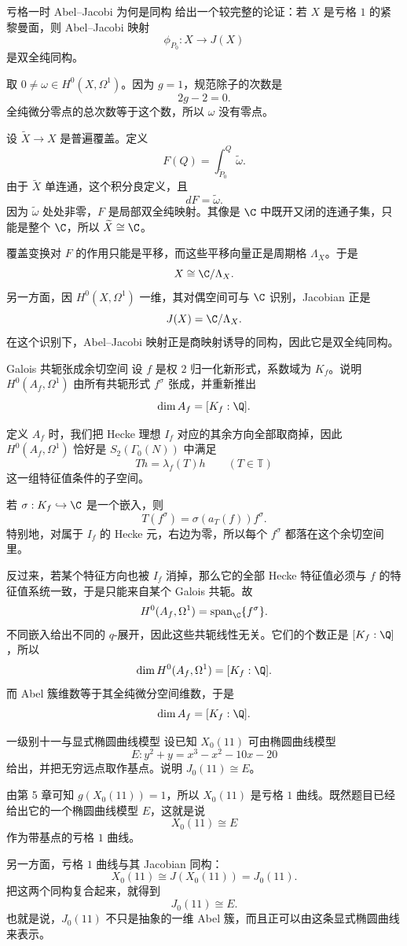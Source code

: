 \begin{problem}{亏格一时 Abel--Jacobi 为何是同构}
\hard
给出一个较完整的论证：若 $X$ 是亏格 $1$ 的紧黎曼面，则 Abel--Jacobi 映射
\[
\phi_{P_0}:X\to J(X)
\]
是双全纯同构。
\end{problem}
\begin{solution}
取 $0\ne \omega\in H^0(X,\Omega^1)$。因为 $g=1$，规范除子的次数是
\[
2g-2=0.
\]
全纯微分零点的总次数等于这个数，所以 $\omega$ 没有零点。

设 $\widetilde X\to X$ 是普遍覆盖。定义
\[
F(Q)=\int_{\widetilde P_0}^{Q}\widetilde\omega.
\]
由于 $\widetilde X$ 单连通，这个积分良定义，且
\[
dF=\widetilde\omega.
\]
因为 $\widetilde\omega$ 处处非零，$F$ 是局部双全纯映射。其像是 $\C$ 中既开又闭的连通子集，只能是整个 $\C$，所以 $\widetilde X\cong \C$。

覆盖变换对 $F$ 的作用只能是平移，而这些平移向量正是周期格 $\Lambda_X$。于是
\[
X\cong \C/\Lambda_X.
\]
另一方面，因 $H^0(X,\Omega^1)$ 一维，其对偶空间可与 $\C$ 识别，Jacobian 正是
\[
J(X)=\C/\Lambda_X.
\]
在这个识别下，Abel--Jacobi 映射正是商映射诱导的同构，因此它是双全纯同构。
\end{solution}

\begin{problem}{Galois 共轭张成余切空间}
\hard
设 $f$ 是权 $2$ 归一化新形式，系数域为 $K_f$。说明 $H^0(A_f,\Omega^1)$ 由所有共轭形式 $f^\sigma$ 张成，并重新推出
\[
\dim A_f=[K_f:\Q].
\]
\end{problem}
\begin{solution}
定义 $A_f$ 时，我们把 Hecke 理想 $I_f$ 对应的其余方向全部取商掉，因此 $H^0(A_f,\Omega^1)$ 恰好是 $S_2(\Gamma_0(N))$ 中满足
\[
Th=\lambda_f(T)h
\qquad (T\in \mathbb T)
\]
这一组特征值条件的子空间。

若 $\sigma:K_f\hookrightarrow \C$ 是一个嵌入，则
\[
T(f^\sigma)=\sigma(a_T(f))f^\sigma.
\]
特别地，对属于 $I_f$ 的 Hecke 元，右边为零，所以每个 $f^\sigma$ 都落在这个余切空间里。

反过来，若某个特征方向也被 $I_f$ 消掉，那么它的全部 Hecke 特征值必须与 $f$ 的特征值系统一致，于是只能来自某个 Galois 共轭。故
\[
H^0(A_f,\Omega^1)=\operatorname{span}_\C\{f^\sigma\}.
\]
不同嵌入给出不同的 $q$-展开，因此这些共轭线性无关。它们的个数正是 $[K_f:\Q]$，所以
\[
\dim H^0(A_f,\Omega^1)=[K_f:\Q].
\]
而 Abel 簇维数等于其全纯微分空间维数，于是
\[
\dim A_f=[K_f:\Q].
\]
\end{solution}

\begin{problem}{一级别十一与显式椭圆曲线模型}
\hard
设已知 $X_0(11)$ 可由椭圆曲线模型
\[
E: y^2+y=x^3-x^2-10x-20
\]
给出，并把无穷远点取作基点。说明 $J_0(11)\cong E$。
\end{problem}
\begin{solution}
由第 5 章可知 $g(X_0(11))=1$，所以 $X_0(11)$ 是亏格 $1$ 曲线。既然题目已经给出它的一个椭圆曲线模型 $E$，这就是说
\[
X_0(11)\cong E
\]
作为带基点的亏格 $1$ 曲线。

另一方面，亏格 $1$ 曲线与其 Jacobian 同构：
\[
X_0(11)\cong J(X_0(11))=J_0(11).
\]
把这两个同构复合起来，就得到
\[
J_0(11)\cong E.
\]
也就是说，$J_0(11)$ 不只是抽象的一维 Abel 簇，而且正可以由这条显式椭圆曲线来表示。
\end{solution}

